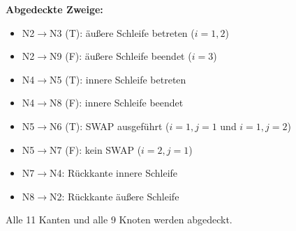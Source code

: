 \documentclass[
	fontsize=12pt,          %
	paper=a4,               %
	numbers=noenddot,       %
	listof=totoc,           %
	listof=entryprefix,     %
	listof=nochaptergap,    %
	bibliography=totoc,     %
	parskip=half,           %
	openany                 %
]{scrbook}
\begin{document}
\textbf{Abgedeckte Zweige:}
\begin{itemize}
	\item N2$\to$N3 (T): äußere Schleife betreten ($i = 1, 2$)
	\item N2$\to$N9 (F): äußere Schleife beendet ($i = 3$)
	\item N4$\to$N5 (T): innere Schleife betreten
	\item N4$\to$N8 (F): innere Schleife beendet
	\item N5$\to$N6 (T): SWAP ausgeführt ($i{=}1, j{=}1$ und $i{=}1, j{=}2$)
	\item N5$\to$N7 (F): kein SWAP ($i{=}2, j{=}1$)
	\item N7$\to$N4: Rückkante innere Schleife
	\item N8$\to$N2: Rückkante äußere Schleife
\end{itemize}

Alle 11 Kanten und alle 9 Knoten werden abgedeckt.

\end{document}
